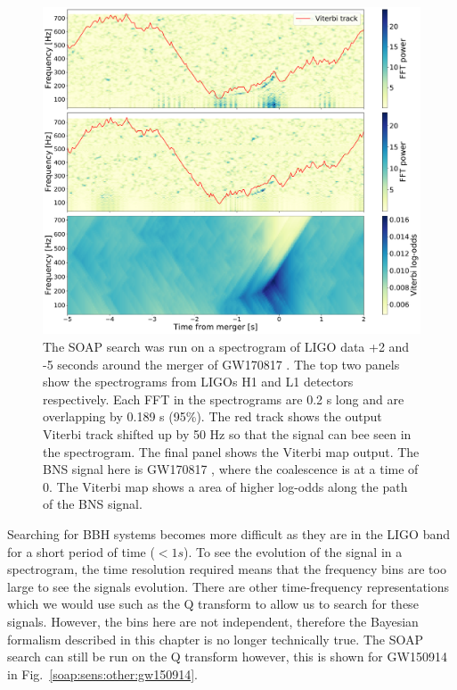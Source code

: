 \begin{figure}[ht]
	\centering
	\includegraphics[width=\linewidth]{C3_soap/gw170817_vitplot.pdf}
        \caption[SOAP search run on GW170817]{The SOAP search was run on a
spectrogram of \gls{LIGO} data +2 and -5 seconds around the merger of GW170817
\citep{abbott2017GW170817Observation}. The top two panels show the spectrograms from \glspl{LIGO} H1 and L1 detectors respectively. Each \gls{FFT} in the spectrograms are
0.2 s long and are overlapping by  0.189 s (95\%). The red track shows the output Viterbi track shifted up by 50 Hz so that the signal can bee seen in the spectrogram. The final panel shows the Viterbi map output. The \gls{BNS} signal here is GW170817 \citep{abbott2017GW170817Observation}, where the coalescence is at a time of 0. The Viterbi map shows a area of higher
log-odds along the path of the \gls{BNS} signal.}
\label{soap:sens:other:gw170817}

\end{figure}

Searching for \gls{BBH} systems becomes more difficult as they are in the \gls{LIGO} band for a short period of time ($ < 1 s$).
To see the evolution of the signal in a spectrogram, the time resolution required means that the frequency bins are too large to see the signals evolution.
There are other time-frequency representations which we would use such as the Q transform to allow us to search for these signals. However, the bins here are not independent, therefore the Bayesian formalism described in this chapter is no longer technically true.
The SOAP search can still be run on the Q transform however, this is shown for GW150914 \citep{abbott2016ObservationGravitational} in Fig.~\ref{soap:sens:other:gw150914}.


